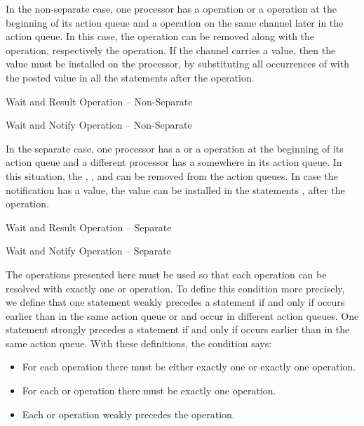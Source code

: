 In the non-separate case, one processor has a  operation or a  operation at the beginning of its action queue and a  operation on the same channel later in the action queue. In this case, the  operation can be removed along with the  operation, respectively the  operation. If the channel carries a value, then the value must be installed on the processor, by substituting all occurrences of  with the posted value in all the statements  after the  operation.

\singlelineinferencerule
	{Wait and Result Operation -- Non-Separate}
	{}
	{}
	{}
 
\singlelineinferencerule
	{Wait and Notify Operation -- Non-Separate}
	{}
	{}
	{}
 
In the separate case, one processor has a  or a  operation at the beginning of its action queue and a different processor has a  somewhere in its action queue. In this situation, the , , and  can be removed from the action queues. In case the notification has a value, the value can be installed in the statements , after the  operation.

\singlelineinferencerule
	{Wait and Result Operation -- Separate}
	{}
	{}
	{}
 
\singlelineinferencerule
	{Wait and Notify Operation -- Separate}
	{}
	{}
	{}
 
The operations presented here must be used so that each  operation can be resolved with exactly one  or  operation. To define this condition more precisely, we define that one statement  weakly precedes a statement  if and only if  occurs earlier than  in the same action queue or  and  occur in different action queues. One statement  strongly precedes a statement  if and only if  occurs earlier than  in the same action queue. With these definitions, the condition says:
\begin{itemize}
	\item For each  operation there must be either exactly one  or exactly one  operation.
	\item For each  or  operation there must be exactly one  operation.
	\item Each  or  operation weakly precedes the  operation.
\end{itemize}

